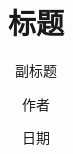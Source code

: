 \documentclass[lang=cn,12pt,color=green,fontset=none,thmcnt=section]{elegantbook}
\title{标题}
\subtitle{副标题}
\author{作者}
\institute{机构}
\date{日期}
\begin{document}
 \maketitle
\frontmatter


\tableofcontents
\mainmatter                 

\chapter{}

\chapter{}

\chapter{}

\chapter{}

\chapter{}

\chapter{}

\chapter{}

\chapter{}

\chapter{}

\chapter{}

\chapter{}
\end{document}
